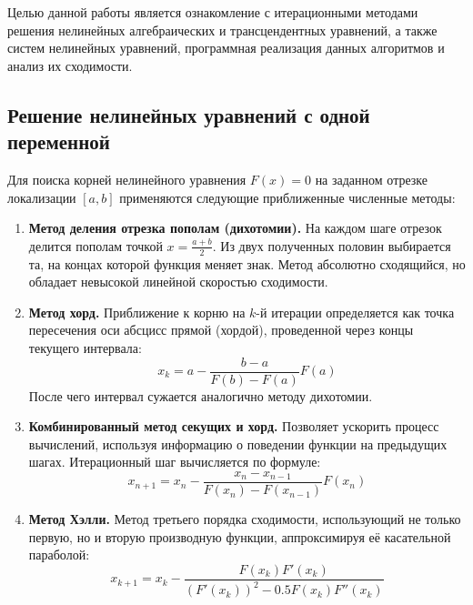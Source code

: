 \documentclass[a4paper]{article}
\begin{document}
Целью данной работы является ознакомление с итерационными методами решения нелинейных алгебраических и трансцендентных уравнений, а также систем нелинейных уравнений, программная реализация данных алгоритмов и анализ их сходимости.

\subsection{Решение нелинейных уравнений с одной переменной}
Для поиска корней нелинейного уравнения $F(x) = 0$ на заданном отрезке локализации $[a, b]$ применяются следующие приближенные численные методы:
\begin{enumerate}
    \item \textbf{Метод деления отрезка пополам (дихотомии).} На каждом шаге отрезок делится пополам точкой $x = \frac{a+b}{2}$. Из двух полученных половин выбирается та, на концах которой функция меняет знак. Метод абсолютно сходящийся, но обладает невысокой линейной скоростью сходимости.
    \item \textbf{Метод хорд.} Приближение к корню на $k$-й итерации определяется как точка пересечения оси абсцисс прямой (хордой), проведенной через концы текущего интервала:
    \begin{equation}
        x_{k}=a-\frac{b-a}{F(b)-F(a)}F(a)
    \end{equation}
    После чего интервал сужается аналогично методу дихотомии.
    \item \textbf{Комбинированный метод секущих и хорд.} Позволяет ускорить процесс вычислений, используя информацию о поведении функции на предыдущих шагах. Итерационный шаг вычисляется по формуле:
    \begin{equation}
        x_{n+1}=x_{n}-\frac{x_{n}-x_{n-1}}{F(x_{n})-F(x_{n-1})}F(x_{n})
    \end{equation}
    \item \textbf{Метод Хэлли.} Метод третьего порядка сходимости, использующий не только первую, но и вторую производную функции, аппроксимируя её касательной параболой:
    \begin{equation}
        x_{k+1}=x_{k}-\frac{F(x_{k})F'(x_{k})}{(F'(x_{k}))^{2}-0.5F(x_{k})F''(x_{k})}
    \end{equation}
\end{enumerate}
\end{document}
